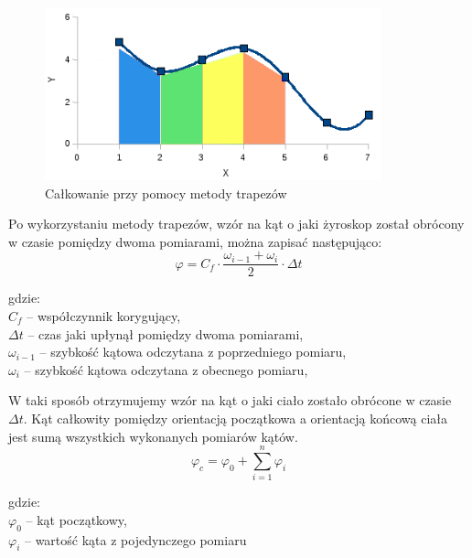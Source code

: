 \begin{figure}[h!]
 \centering
 \includegraphics[height=50mm]{../images/ch04/calkowanie-metoda-trapezow.png}
 \caption[Całkowanie przy pomocy metody trapezów]{Całkowanie przy pomocy metody trapezów\footnotemark}
 \label{fig:CalkowanieTrapezy}
\end{figure}

Po wykorzystaniu metody trapezów, wzór na kąt o jaki żyroskop został obrócony w czasie pomiędzy dwoma pomiarami, można zapisać następująco:
\begin{equation}
  \varphi = C_{f} \cdot \frac{\omega_{i-1} + \omega_{i}}{2} \cdot \Delta t
\end{equation}
\begin{tabbing}
  gdzie: \= \\
    \> $C_{f}$ -- współczynnik korygujący, \\
    \> $\Delta t$ -- czas jaki upłynął pomiędzy dwoma pomiarami,\\
    \> $\omega_{i-1}$ -- szybkość kątowa odczytana z poprzedniego pomiaru,\\
    \> $\omega_{i}$ -- szybkość kątowa odczytana z obecnego pomiaru,\\
\end{tabbing}

W taki sposób otrzymujemy wzór na kąt o jaki ciało zostało obrócone w czasie $\Delta t$. Kąt całkowity pomiędzy orientacją początkowa a orientacją końcową ciała jest sumą wszystkich wykonanych pomiarów kątów.
\begin{equation}
  \varphi_{c} = \varphi_{0} + \sum_{i=1}^{n} \varphi_{i} 
\end{equation}
\begin{tabbing}
  gdzie: \= \\
    \> $\varphi_{0}$ -- kąt początkowy,\\
    \> $\varphi_{i}$ -- wartość kąta z pojedynczego pomiaru\\
\end{tabbing}

